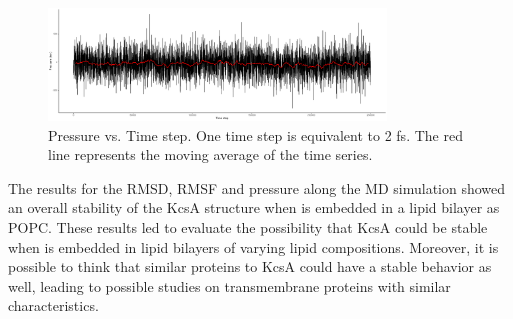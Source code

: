 \documentclass[paper=letter, onecolum, fontsize=12pt]{article}
\begin{document}
\begin{figure}[H]
    \centering
    \includegraphics[width=0.8\textwidth]{Pressure_trace.png}
    \caption{Pressure vs. Time step. One time step is equivalent to 2 fs. The red line represents the moving average of the time series.}
    \label{pressure}
\end{figure}

The results for the RMSD, RMSF and pressure along the MD simulation showed an overall stability of the KcsA structure when is embedded in a lipid bilayer as POPC. These results led to evaluate the possibility that KcsA could be stable when is embedded in lipid bilayers of varying lipid compositions. Moreover, it is possible to think that similar proteins to KcsA could have a stable behavior as well, leading to possible studies on transmembrane proteins with similar characteristics.
\vspace{-5mm}


\end{document}
